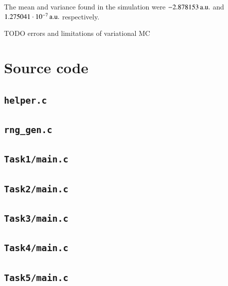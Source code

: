 The mean and variance found in the simulation were $\unit[-2.878153]{a.u.}$ and $\unit[1.275041 \cdot 10^{-7}]{a.u.}$ respectively.

TODO errors and limitations of variational MC






\appendix
\section{Source code}
\subsection{\texttt{helper.c}}


\subsection{\texttt{rng\_gen.c}}


\subsection{\texttt{Task1/main.c}}


\subsection{\texttt{Task2/main.c}}


\subsection{\texttt{Task3/main.c}}


\subsection{\texttt{Task4/main.c}}


\subsection{\texttt{Task5/main.c}}




